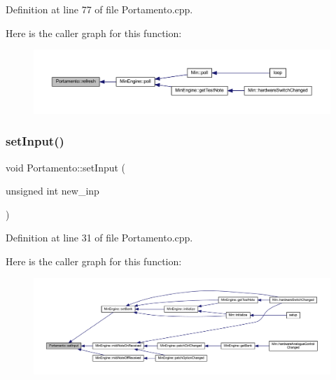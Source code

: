Definition at line 77 of file Portamento.\+cpp.

Here is the caller graph for this function\+:
\nopagebreak
\begin{figure}[H]
\begin{center}
\leavevmode
\includegraphics[width=350pt]{d4/d10/class_portamento_a4a5430c4e0561f9b37bbffdcbb936c43_icgraph}
\end{center}
\end{figure}
\mbox{\label{class_portamento_aa03a209b228dd0335cf103f1614d219a}} 
\subsubsection{\texorpdfstring{set\+Input()}{setInput()}}
{\footnotesize\ttfamily void Portamento\+::set\+Input (\begin{DoxyParamCaption}\item[{unsigned int}]{new\+\_\+inp }\end{DoxyParamCaption})}



Definition at line 31 of file Portamento.\+cpp.

Here is the caller graph for this function\+:
\nopagebreak
\begin{figure}[H]
\begin{center}
\leavevmode
\includegraphics[width=350pt]{d4/d10/class_portamento_aa03a209b228dd0335cf103f1614d219a_icgraph}
\end{center}
\end{figure}
\mbox{\label{class_portamento_aa28dcb234093a065e0970185eb107c78}} 
